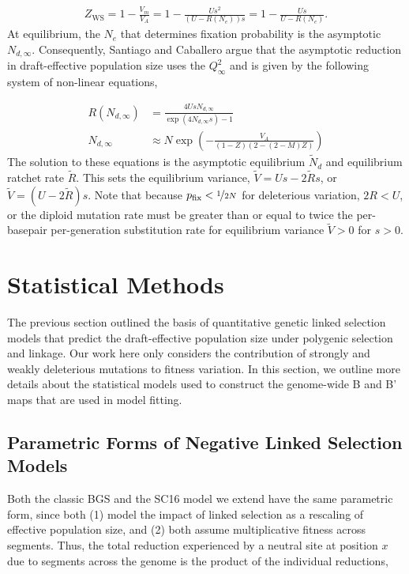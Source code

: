 \documentclass[11pt]{article}
\begin{document}
\begin{align}
  Z_\text{WS} = 1 - \frac{V_m}{V_A} = 1 - \frac{Us^2}{(U-R(N_e))s} = 1 - \frac{Us}{U-R(N_e)}.
\end{align}
%
At equilibrium, the $N_e$ that determines fixation probability is the
asymptotic $N_{d,\infty}$. Consequently, Santiago and Caballero argue that the
asymptotic reduction in draft-effective population size uses the $Q_\infty^2$ and is
given by the following system of non-linear equations,

\begin{align}
    \label{supp-eq:sc16-sys}
  R(N_{d,\infty}) &= \frac{4 U s N_{d,\infty}}{\exp(4 N_{d,\infty} s)-1}\\
  N_{d,\infty} &\approx N \exp\left(-\frac{V_A}{(1-Z) (2-(2-M) Z)} \right)
\end{align}
%
The solution to these equations is the asymptotic equilibrium $\widetilde{N}_d$
and equilibrium ratchet rate $\widetilde{R}$. This sets the equilibrium
variance, $\widetilde{V} = Us - 2\widetilde{R}s$, or $\widetilde{V} = (U -
2\widetilde{R})s$. Note that because $p_\text{fix} < \nicefrac{1}{2N}$ for
deleterious variation, $2R < U$, or the diploid mutation rate must be greater
than or equal to twice the per-basepair per-generation substitution rate for
equilibrium variance $\widetilde{V} > 0$ for $s>0$. 

\section{Statistical Methods}

The previous section outlined the basis of quantitative genetic linked
selection models that predict the draft-effective population size under
polygenic selection and linkage. Our work here only considers the contribution
of strongly and weakly deleterious mutations to fitness variation. In this
section, we outline more details about the statistical models used to construct
the genome-wide B and B' maps that are used in model fitting.

\subsection{Parametric Forms of Negative Linked Selection Models}

Both the classic BGS and the SC16 model we extend have the same parametric
form, since both (1) model the impact of linked selection as a rescaling of
effective population size, and (2) both assume multiplicative fitness across
segments. Thus, the total reduction experienced by a neutral site at position
$x$ due to segments across the genome is the product of the individual
reductions,
\end{document}

